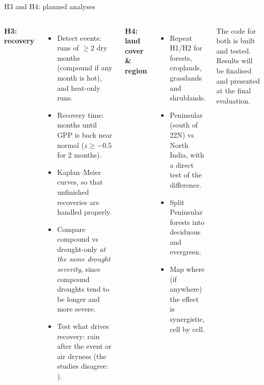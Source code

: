 \documentclass[11pt,aspectratio=169]{beamer}
\begin{document}
\begin{frame}{H3 and H4: planned analyses}
  \footnotesize
  \begin{columns}[T]
    \textbf{H3: recovery}
    \begin{itemize}
      \item Detect events: runs of $\ge2$ dry months (compound if any month
        is hot), and heat-only runs.
      \item Recovery time: months until GPP is back near normal
        ($z \ge -0.5$ for 2 months).
      \item Kaplan--Meier curves, so that unfinished recoveries are handled
        properly.
      \item Compare compound vs drought-only \emph{at the same drought
        severity}, since compound droughts tend to be longer and more
        severe.
      \item Test what drives recovery: rain after the event or air dryness
        (the studies disagree: \citealp{yao2024,huang2025,feng2026}).
    \end{itemize}
    \textbf{H4: land cover \& region}
    \begin{itemize}
      \item Repeat H1/H2 for forests, croplands, grasslands and shrublands.
      \item Peninsular (south of 22\textdegree N) vs North India, with a
        direct test of the difference.
      \item Split Peninsular forests into deciduous and evergreen.
      \item Map where (if anywhere) the effect is synergistic, cell by cell.
    \end{itemize}

    \vspace{4pt}
    \scriptsize The code for both is built and tested. Results will be
    finalised and presented at the final evaluation.
  \end{columns}
\end{frame}
\end{document}
